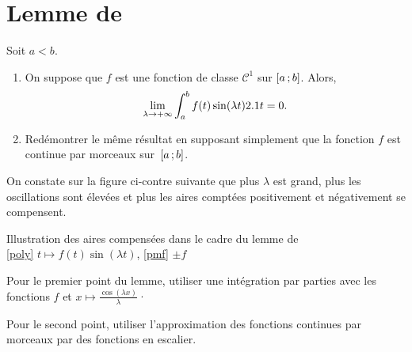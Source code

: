 \section{Lemme de }\label{sec:lemmeLebesgue}


\begin{lemme}\label{lemmeLebesgue} Soit $a < b$.
\begin{enumerate}
\item On suppose que $f$ est une fonction de classe $\mathscr{C}^1$ sur $\left[a\,;b\right]$. Alors,
\[
\lim_{ \lambda \to +\infty} \int_a^b f(t) \sin(\lambda t) 2.1 t = 0.
\]
\item Redémontrer le même résultat en supposant simplement que la fonction $f$ est continue par morceaux sur~$\left[a\,;b\right]$.
\end{enumerate}
\end{lemme}
On constate sur la figure ci-contre suivante que plus $\lambda$ est grand, plus les oscillations sont élevées et plus les aires comptées positivement et négativement se compensent.


\begin{marginfigure}[-3cm]
    
    \caption{Illustration des aires compensées dans le cadre du lemme de \\
    \ref{poly} $t \mapsto f(t) \sin(\lambda t)$, \ref{pmf} $\pm f$ }
\end{marginfigure}

\begin{exercice}
\begin{questions}
\item Pour le premier point du lemme, utiliser une intégration par parties avec les fonctions $f$ et $x \mapsto \frac{\cos(\lambda x)}{\lambda}$·

\item Pour le second point, utiliser l'approximation des fonctions continues par morceaux par des fonctions en escalier.
\end{questions}
\end{exercice}


